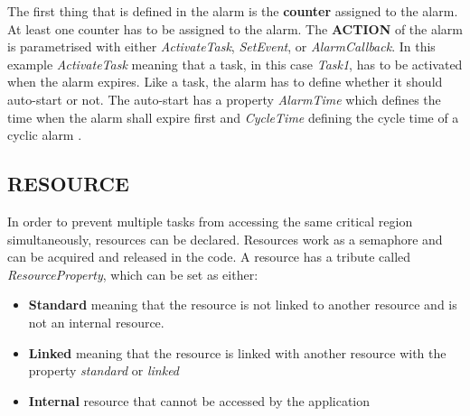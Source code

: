 The first thing that is defined in the alarm is the \textbf{counter} assigned to the alarm.
At least one counter has to be assigned to the alarm.
The \textbf{ACTION} of the alarm is parametrised with either \textit{ActivateTask}, \textit{SetEvent}, or \textit{AlarmCallback}\cite{irisa25}.
In this example \textit{ActivateTask} meaning that a task, in this case \textit{Task1}, has to be activated when the alarm expires. 
Like a task, the alarm has to define whether it should auto-start or not.
The auto-start has a property \textit{AlarmTime} which defines the time when the alarm shall expire first and \textit{CycleTime} defining the cycle time of a cyclic alarm \cite{irisa25}.

\subsection{RESOURCE}
In order to prevent multiple tasks from accessing the same critical region simultaneously, resources can be declared.
Resources work as a semaphore and can be acquired and released in the code.
A resource has a tribute called \textit{ResourceProperty}, which can be set as either:
\begin{itemize}
\item \textbf{Standard} meaning that the resource is not linked to another resource and is not an internal resource.
\item \textbf{Linked} meaning that the resource is linked with another resource with the property \textit{standard} or \textit{linked}
\item \textbf{Internal} resource that cannot be accessed by the application \cite{irisa25}
\end{itemize}

